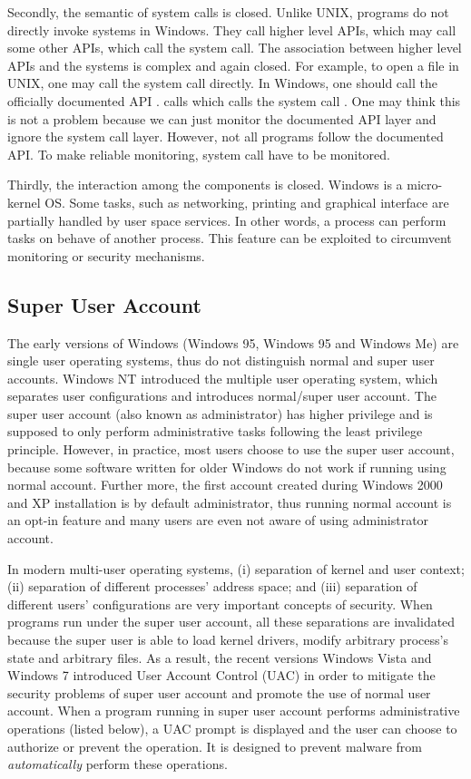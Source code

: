 Secondly, the semantic of system calls is closed.
Unlike UNIX, programs do not directly invoke systems in Windows.
They call higher level APIs, which may call some other APIs, which call
the system call.
The association between higher level APIs and the systems is complex and
again closed.
For example, to open a file in UNIX, one may call the 
system call directly.
In Windows, one should call the officially documented API .
 calls  which calls
the system call .
One may think this is not a problem because we can just monitor the documented
API layer and ignore the system call layer.
However, not all programs follow the documented API.
To make reliable monitoring, system call have to be monitored.

Thirdly, the interaction among the components is closed.
Windows is a micro-kernel OS.
Some tasks, such as networking, printing and graphical interface are partially
handled by user space services.
In other words, a process can perform tasks on behave of another process.
This feature can be exploited to circumvent monitoring or
security mechanisms.

\subsection{Super User Account}

The early versions of Windows (Windows 95, Windows 95 and Windows Me)
are single user operating systems, thus do not distinguish normal and
super user accounts.
Windows NT introduced the multiple user operating system, which
separates user configurations and introduces normal/super user account.
The super user account (also known as administrator) has higher privilege and
is supposed to only perform administrative tasks following the
least privilege principle.
However, in practice,
most users choose to use the super user account,
because some software written for older Windows do not work if running using
normal account.
Further more, the first account created during Windows 2000 and XP installation
is by default administrator,
thus running normal account is an opt-in feature and
many users are even not aware of using administrator account.

In modern multi-user operating systems,
(i) separation of kernel and user context;
(ii) separation of different processes' address space; and
(iii) separation of different users' configurations are
very important concepts of security.
When programs run under the super user account,
all these separations are invalidated because the super user
is able to load kernel drivers, modify arbitrary process's state
and arbitrary files.
As a result, the recent versions Windows Vista and Windows 7 introduced
User Account Control (UAC) in order to mitigate the security problems of
super user account and promote the use of normal user account.
When a program running in super user account performs administrative
operations (listed below),
a UAC prompt is displayed and the user can choose to authorize or prevent
the operation.
It is designed to prevent malware from {\em automatically}
perform these operations.

